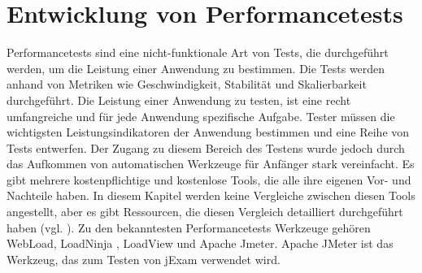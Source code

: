 \section{Entwicklung von Performancetests}

Performancetests sind eine nicht-funktionale Art von Tests, die
durchgeführt werden, um die Leistung einer Anwendung zu bestimmen.
Die Tests werden anhand von Metriken wie Geschwindigkeit, Stabilität
und Skalierbarkeit durchgeführt. Die Leistung einer Anwendung zu testen,
ist eine recht umfangreiche und für jede Anwendung spezifische Aufgabe.
Tester müssen die wichtigsten Leistungsindikatoren der Anwendung bestimmen
und eine Reihe von Tests entwerfen. Der Zugang zu diesem Bereich des
Testens wurde jedoch durch das Aufkommen von automatischen Werkzeuge für
Anfänger stark vereinfacht.  Es gibt mehrere kostenpflichtige und kostenlose
Tools, die alle ihre eigenen Vor- und Nachteile haben. In diesem Kapitel
werden keine Vergleiche zwischen diesen Tools angestellt, aber es gibt
Ressourcen, die diesen Vergleich detailliert durchgeführt haben
(vgl. \cite{perfComp}).  Zu den bekanntesten Performancetests Werkzeuge
gehören WebLoad, LoadNinja , LoadView und Apache Jmeter. Apache JMeter
ist das Werkzeug, das zum Testen von jExam verwendet wird.


